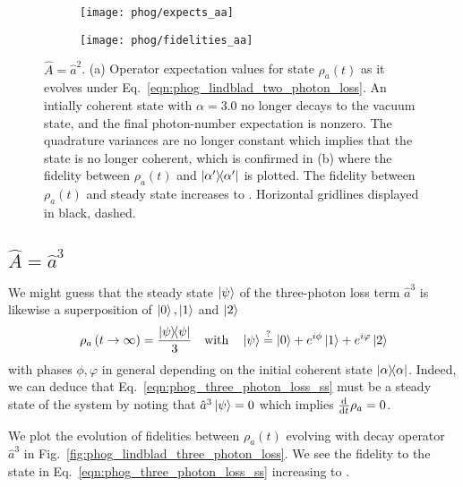 \begin{figure}[htp]
\centering
	\begin{subfigure}{0.6\linewidth}
	\centering
	\texttt{[image: phog/expects\_aa]}
	\caption{}
	\end{subfigure}
	\begin{subfigure}{0.6\linewidth}
	\centering
	\texttt{[image: phog/fidelities\_aa]}
	\caption{}
	\end{subfigure}
\caption{\label{fig:phog_lindblad_two_photon_loss}$\hat{A} = \hat{a}^2$. (a) Operator expectation values for state $\rho_a\left(t\right)$ as it evolves under Eq.~\ref{eqn:phog_lindblad_two_photon_loss}. An intially coherent state with $\alpha=3.0$ no longer decays to the vacuum state, and the final photon-number expectation is nonzero. The quadrature variances are no longer constant which implies that the state is no longer coherent, which is confirmed in (b) where the fidelity between $\rho_a\left(t\right)$ and $\dyad{\alpha^\prime}$ is plotted. The fidelity between $\rho_a\left(t\right)$ and steady state increases to . Horizontal gridlines displayed in black, dashed.}
\end{figure}



\subsection{$\hat{A} = \hat{a}^3$}
We might guess that the steady state $\ket{\psi}$ of the three-photon loss term $\hat{a}^3$ is likewise a superposition of $\ket{0}, \ket{1}$ and $\ket{2}$
\begin{equation}\label{eqn:phog_three_photon_loss_ss}
\rho_a\left(t\rightarrow\infty\right) = \frac{\dyad{\psi}}{3} \qq{with} \ket{\psi} \stackrel{?}{=} \ket{0} + e^{i \phi}\ket{1} + e^{i \varphi}\ket{2}
\end{equation}
with phases $\phi, \varphi$ in general depending on the initial coherent state $\dyad{\alpha}$. %
Indeed, we can deduce that Eq.~\ref{eqn:phog_three_photon_loss_ss} must be a steady state of the system by noting that $\hat{a}^3 \ket{\psi} = 0$ which implies $\frac{\mathrm{d}}{\mathrm{d}t} \rho_a = 0$.


We plot the evolution of fidelities between $\rho_a\left(t\right)$ evolving with decay operator $\hat{a}^3$ in Fig.~\ref{fig:phog_lindblad_three_photon_loss}. We see the fidelity to the state in Eq.~\ref{eqn:phog_three_photon_loss_ss} increasing to . 

